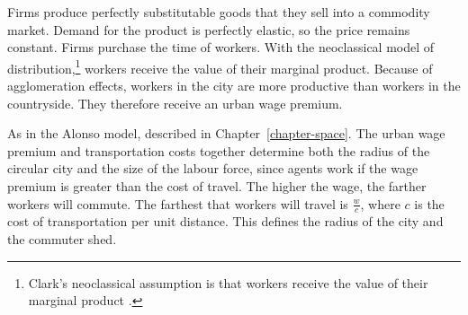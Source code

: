 Firms produce perfectly \gls{substitutable} %
goods that they sell into a commodity market. Demand for the \gls{product} is \gls{perfectly elastic}, so the price remains constant. 
Firms purchase the time of workers. %
With the neoclassical model of distribution,\footnote{Clark's neoclassical assumption is that workers receive the value of their marginal product \cite{clarkDistributionWealthTheory1899}.} 
workers receive the value of their marginal product. 
Because of agglomeration effects, workers in the city are more productive than workers in the countryside. They therefore receive an \gls{urban wage premium}.


As in the Alonso model, described in Chapter~\ref{chapter-space}. The \gls{urban wage premium} and transportation costs together determine both the radius of the circular city and the size of the labour force, %
since agents work if the wage premium is greater than the cost of travel. %
The higher the wage, the farther workers will commute. %
The farthest that workers will travel is $\frac{w}{{c}}$, where ${c}$ is the cost of transportation per unit distance. This defines the radius of the city and the commuter shed.

